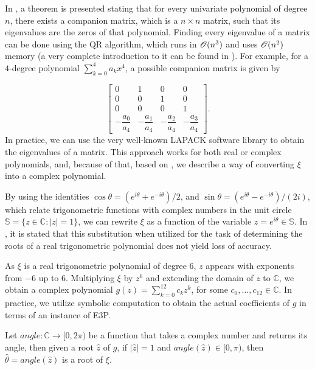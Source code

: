 In \cite[p.~195]{horn}, a theorem is presented stating that for every univariate polynomial of degree $n$, there exists a companion matrix, which is a $n\times n$ matrix, such that its eigenvalues are the zeros of that polynomial. Finding every eigenvalue of a matrix can be done using the QR algorithm, which runs in $\mathscr{O}(n^3)$ and uses $\mathscr{O}(n^2)$ memory (a very complete introduction to it can be found in \cite{watkins:2008}). For example, for a {\color{blue} $4$-degree} polynomial $\sum_{k=0}^4 a_k x^4$, a possible companion matrix is given by

 \begin{equation*}
\left[\begin{array}{ccccc}
0 & 1 & 0 & 0\\
0 & 0 & 1 & 0\\
0 & 0 & 0 & 1\\
-\dfrac{a_0}{a_4} & -\dfrac{a_1}{a_4} & -\dfrac{a_2}{a_4} & -\dfrac{a_3}{a_4}
\end{array}\right].
\end{equation*}
In practice, we can use the very well-known LAPACK software library to obtain the eigenvalues of a matrix\cite{lapack}.
This approach works for both real or complex polynomials, and, because of that, based on \cite{weidner}, we describe a way of converting $\xi$ into a complex polynomial.

By using the identities $\cos{\theta} = (e^{i\theta} + e^{-i\theta})/2$, and $\sin{\theta} = (e^{i\theta} - e^{-i\theta})/(2i)$, which relate trigonometric functions with complex numbers in the unit circle $\mathbb{S}=\{z\in \mathbb{C}\colon |z|=1\}$, we can rewrite $\xi$ as a function of the variable $z=e^{i\theta}\in\mathbb{S}$. In \cite{weidner}, it is stated that this substitution when utilized for the task of determining the roots of a real trigonometric polynomial does not yield loss of accuracy.

As $\xi$ is a real trigonometric polynomial of degree $6$, $z$ appears with exponents from $-6$ up to $6$. Multiplying $\xi$ by $z^6$ and extending the domain of $z$ to $\mathbb{C}$, we obtain a complex polynomial $g(z)=\sum_{k=0}^{12} c_k z^k$, for some $c_0, \dots, c_{12} \in \mathbb{C}$. In practice, we utilize symbolic computation to obtain the actual coefficients of $g$ in terms of an instance of E3P.

Let $angle \colon \mathbb{C} \to [0, 2\pi)$ be a function that takes a complex number and returns its angle, then given a root $\hat{z}$ of $g$, if $|\hat{z}|=1$ and $angle(\hat{z}) \in [0, \pi)$, then $\hat{\theta} = angle(\hat{z})$ is a root of $\xi$. 


